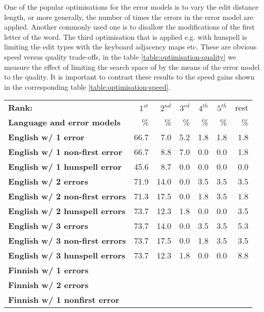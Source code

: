 \documentclass[a4paper,12pt]{article}
\begin{document}
One of the popular optimisations for the error models is to vary the edit
distance length, or more generally, the number of times the errors in the error
model are applied.  Another commonly used one is to disallow the modifications
of the first letter of the word. The third optimisation that is applied e.g.
with hunspell is limiting the edit types with the keyboard adjacency maps etc.
These are obvious speed versus quality trade-offs, in the table
\ref{table:optimisation-quality} we measure the effect of limiting the search
space of by the means of the error model to the quality. It is important to
contrast these results to the speed gains shown in the corresponding table
\ref{table:optimisation-speed}.

\begin{table}
    \centering
    \begin{tabular}{|l|r|r|r|r|r|r|}
        \hline
        \bf Rank: & $1^{st}$ & $2^{nd}$ & $3^{rd}$ & $4^{th}$ & $5^{th}$ & rest \\
        \bf Language and error models &  \% & \% & \% & \% & \% & \% \\
        \hline
        \bf English w/ 1 error     & 66.7 & 7.0  & 5.2 & 1.8 & 1.8 & 1.8 \\
 \bf English w/ 1 non-first error  & 66.7 & 8.8  & 7.0 & 0.0 & 0.0 & 1.8 \\
 \bf English w/ 1 hunspell error   & 45.6 & 8.7  & 0.0 & 0.0 & 0.0 & 0.0 \\
     \bf English w/ 2 errors       & 71.9 & 14.0 & 0.0 & 3.5 & 3.5 & 3.5 \\
 \bf English w/ 2 non-first errors & 71.3 & 17.5 & 0.0 & 1.8 & 3.5 & 1.8 \\
 \bf English w/ 2 hunspell errors  & 73.7 & 12.3 & 1.8 & 0.0 & 0.0 & 3.5 \\
   \bf English w/ 3 errors         & 73.7 & 14.0 & 0.0 & 3.5 & 3.5 & 5.3 \\
 \bf English w/ 3 non-first errors & 73.7 & 17.5 & 0.0 & 1.8 & 3.5 & 3.5 \\
 \bf English w/ 3 hunspell errors  & 73.7 & 12.3 & 1.8 & 0.0 & 0.0 & 8.8 \\
        \hline
        \bf Finnish w/ 1 errors & & & & & & \\
        \bf Finnish w/ 2 errors & & & & & & \\
\bf Finnish w/ 1 nonfirst error & & & & & & \\

\end{tabular}
\end{table}
\end{document}
